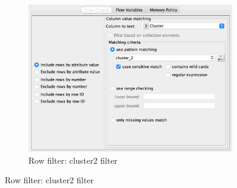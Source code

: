 \documentclass[11pt]{article}
\begin{document}
\begin{figure}[H]
\begin{subfigure}{0.4\textwidth}
					\includegraphics[width=\textwidth]{res/t1/t14/t14-row-filter-3-conf}
					\caption{Row filter: cluster2 filter}
					\label{fig:third}
				\end{subfigure}	
				\label{fig:figures}
			\end{figure}
			\fi
			
\end{document}
